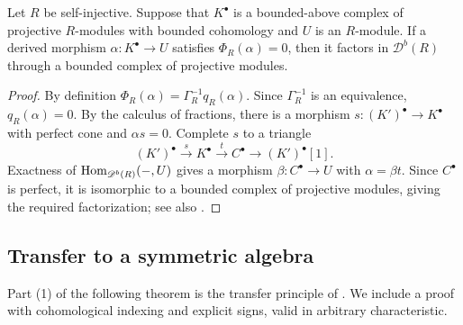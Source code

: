 \documentclass[11pt]{article}
\begin{document}
\begin{Lem}\label{lift:zero-perfect}
Let $R$ be self-injective. Suppose that $K^\bullet$ is a bounded-above
complex of projective $R$-modules with bounded cohomology and
$U$ is an $R$-module. If a derived morphism
$\alpha:K^\bullet\to U$ satisfies $\Phi_R(\alpha)=0$, then it
factors in $\mathscr D^b(R)$ through a bounded complex of projective
modules.
\end{Lem}
\begin{proof}
By definition $\Phi_R(\alpha)=\Gamma_R^{-1}q_R(\alpha)$.
Since $\Gamma_R^{-1}$ is an equivalence, $q_R(\alpha)=0$.
By the calculus of fractions, there is a morphism
$s:(K')^\bullet\to K^\bullet$ with perfect cone and $\alpha s=0$.
Complete $s$ to a triangle
\[
 (K')^\bullet\xrightarrow{s}K^\bullet\xrightarrow{t}C^\bullet
 \longrightarrow(K')^\bullet[1].
\]
Exactness of ${\rm Hom}_{\mathscr D^b(R)}(-,U)$ gives a morphism
$\beta:C^\bullet\to U$ with $\alpha=\beta t$.
Since $C^\bullet$ is perfect, it is isomorphic to a bounded
complex of projective modules, giving the required factorization;
see also \cite[Remark~3.2.3(2)]{KrauseHTR}.
\end{proof}

\subsection{Transfer to a symmetric algebra}

Part \textup{(1)} of the following theorem is the transfer principle of
\cite[Proposition~3.2]{O}. We include a proof with cohomological
indexing and explicit signs, valid in arbitrary characteristic.
\end{document}
